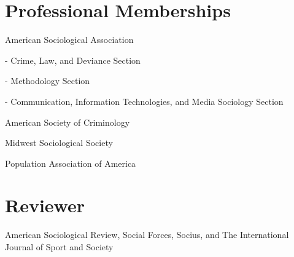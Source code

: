 \documentclass[letterpaper]{article}
\renewenvironment{itemize}{
  \begin{list}{}{
    \setlength{\leftmargin}{1.5em}
  }
}{
  \end{list}
}
\begin{document}
\section*{\textbf{Professional Memberships}}
\begin{itemize}

\item American Sociological Association
\begin{itemize}
\item - Crime, Law, and Deviance Section
\item - Methodology Section
\item - Communication, Information Technologies, and Media Sociology Section
\end{itemize}
\item American Society of Criminology
\item Midwest Sociological Society
\item Population Association of America

\end{itemize}

\section*{\textbf{Reviewer}}

American Sociological Review, Social Forces, Socius, and The International Journal of Sport and Society


\iffalse

\section*{\textbf{References}}

\begin{minipage}{0.4\linewidth}
  \href{ http://www.soc.umn.edu/~uggen/}{Chris Uggen} \\
   Distinguished McKnight Professor \\
   \href{http://www.umn.edu/}{University of Minnesota}\\
  \href{mailto:uggen001@umn.edu}{uggen001@umn.edu}
\end{minipage}
\begin{minipage}{0.33\linewidth}
  \href{http://cla.umn.edu/about/directory/profile/hartm021}{Doug Hartmann} \\
   Professor of Sociology \\
   \href{http://www.umn.edu/}{University of Minnesota}\\
  \href{mailto:hartm021@umn.edu}{hartm021@umn.edu}
\end{minipage}

\begin{minipage}{0.33\linewidth}
  \href{https://academics.skidmore.edu/blogs/alindner/}{Andrew Lindner} \\
   Associate Professor of Sociology \\
   \href{http://www.skidmore.edu/}{Skidmore College}\\
  \href{mailto:alindner@skidmore.edu}{alindner@skidmore.edu}
\end{minipage}







\fi
\end{document}
